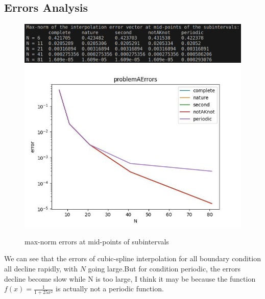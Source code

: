 \documentclass{article}
\begin{document}
\subsection{Errors Analysis}
\begin{figure}[h]
    \centering
    \includegraphics[width=\linewidth]{problemAerrors.png}
    \includegraphics[width=0.7\linewidth]{problemAErrors.jpg}
    \caption{max-norm errors at mid-points of subintervals}
\end{figure}

We can see that the errors of cubic-spline interpolation for all boundary condition all decline rapidly, with $N$ going large.But for condition periodic, the errors decline become slow while N is too large, I think it may be because the function $f(x)=\frac{1}{1+25x^2}$ is actually not a periodic function.
\end{document}
